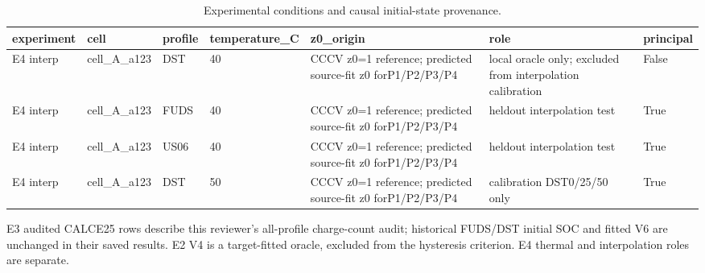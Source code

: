 \begin{table}[!t]
\centering
\footnotesize
\caption{Experimental conditions and causal initial-state provenance.}
\label{tab:reviewer-conditions-7}
\setlength{\tabcolsep}{3pt}
\begin{tabular}{llll p{} p{} l}
\toprule
experiment & cell & profile & temperature\_C & z0\_origin & role & principal \\
\midrule
E4 interp & cell\_A\_a123 & DST & 40 & CCCV z0=1 reference; predicted source-fit z0 forP1/P2/P3/P4 & local oracle only; excluded from interpolation calibration & False \\
E4 interp & cell\_A\_a123 & FUDS & 40 & CCCV z0=1 reference; predicted source-fit z0 forP1/P2/P3/P4 & heldout interpolation test & True \\
E4 interp & cell\_A\_a123 & US06 & 40 & CCCV z0=1 reference; predicted source-fit z0 forP1/P2/P3/P4 & heldout interpolation test & True \\
E4 interp & cell\_A\_a123 & DST & 50 & CCCV z0=1 reference; predicted source-fit z0 forP1/P2/P3/P4 & calibration DST0/25/50 only & True \\
\bottomrule
\end{tabular}
\par\smallskip\begin{minipage}{0.98\textwidth}\footnotesize E3 audited CALCE25 rows describe this reviewer's all-profile charge-count audit; historical FUDS/DST initial SOC and fitted V6 are unchanged in their saved results. E2 V4 is a target-fitted oracle, excluded from the hysteresis criterion. E4 thermal and interpolation roles are separate.\end{minipage}
\end{table}
